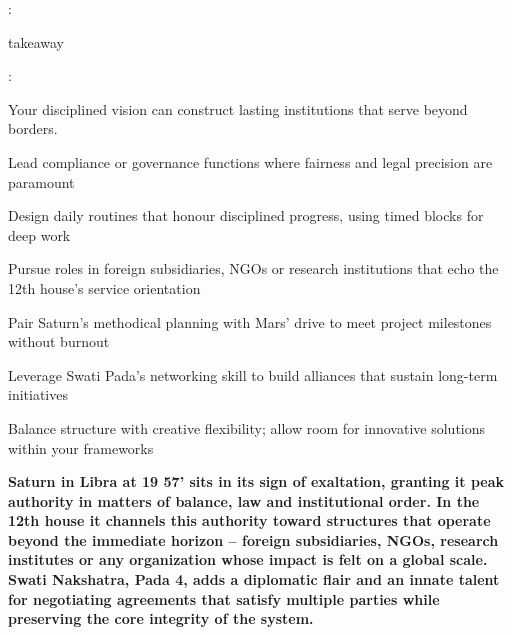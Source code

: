 {\fontsize{9}{13}\selectfont :}\par\vspace{1.8mm}

{\fontsize{9}{13}\selectfont takeaway}\par\vspace{1.8mm}

{\fontsize{9}{13}\selectfont :}\par\vspace{1.8mm}

{\fontsize{9}{13}\selectfont Your disciplined vision can construct lasting institutions that serve beyond borders.}\par\vspace{1.8mm}

\begin{diamondlist}
  \item {\fontsize{8.5}{12}\selectfont Lead compliance or governance functions where fairness and legal precision are paramount}
  \item {\fontsize{8.5}{12}\selectfont Design daily routines that honour disciplined progress, using timed blocks for deep work}
  \item {\fontsize{8.5}{12}\selectfont Pursue roles in foreign subsidiaries, NGOs or research institutions that echo the 12th house's service orientation}
  \item {\fontsize{8.5}{12}\selectfont Pair Saturn's methodical planning with Mars' drive to meet project milestones without burnout}
  \item {\fontsize{8.5}{12}\selectfont Leverage Swati Pada's networking skill to build alliances that sustain long-term initiatives}
  \item {\fontsize{8.5}{12}\selectfont Balance structure with creative flexibility; allow room for innovative solutions within your frameworks}
\end{diamondlist}


\label{topic34}

{\fontsize{9.5}{13.8}\selectfont\bfseries\color{DeepSlate} Saturn in Libra at 19\textdegree{} 57' sits in its sign of exaltation, granting it peak authority in matters of balance, law and institutional order. In the 12th house it channels this authority toward structures that operate beyond the immediate horizon -- foreign subsidiaries, NGOs, research institutes or any organization whose impact is felt on a global scale. Swati Nakshatra, Pada 4, adds a diplomatic flair and an innate talent for negotiating agreements that satisfy multiple parties while preserving the core integrity of the system.}\par\vspace{2mm}

